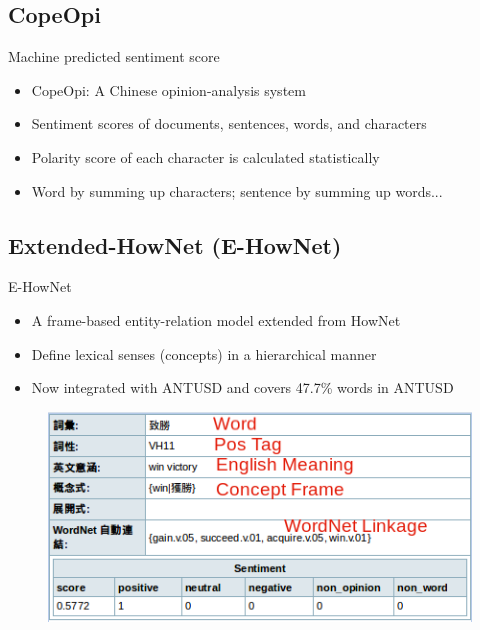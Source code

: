 \documentclass[compress]{beamer}
\begin{document}
    \subsection{CopeOpi}
        \begin{frame}{\subsecname}
            \begin{block}{Machine predicted sentiment score}
                \begin{itemize}
                    \item CopeOpi: A Chinese opinion-analysis system
                    \item Sentiment scores of documents, sentences, words, and characters 
                    \item Polarity score of each character is calculated statistically
                    \item Word by summing up characters; sentence by summing up words...
                \end{itemize}
            \end{block}
        \end{frame}

    \subsection{Extended-HowNet (E-HowNet)}
        \begin{frame}{\subsecname}
            \begin{block}{E-HowNet}
                \begin{itemize}
                    \item A frame-based entity-relation model extended from HowNet
                    \item Define lexical senses (concepts) in a hierarchical manner
                    \item Now integrated with ANTUSD and covers 47.7\% words in ANTUSD
                \end{itemize}
            \end{block}
            \pause
            \begin{figure}
                \includegraphics[height=.5\textheight]{e-hownet}
            \end{figure}
        \end{frame}
\end{document}
